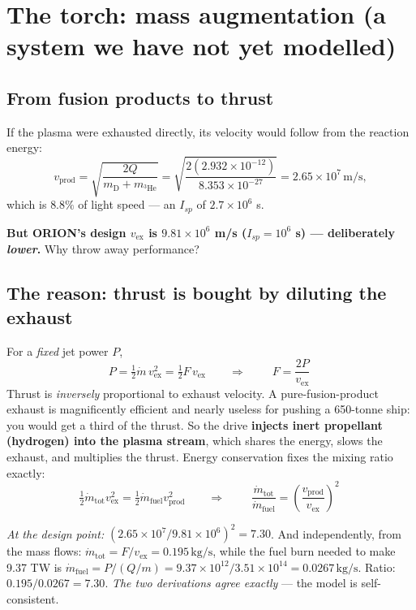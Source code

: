 \documentclass[11pt]{article}
\newcommand{\ve}{v_{\text{ex}}}
\newcommand{\he}{\ensuremath{{}^3\mathrm{He}}}
\newcommand{\unit}[1]{\,\mathrm{#1}}
\begin{document}
\section{The torch: mass augmentation (a system we have not yet modelled)}

\subsection{From fusion products to thrust}
If the plasma were exhausted directly, its velocity would follow from the reaction energy:
\begin{equation}
v_{\text{prod}}=\sqrt{\frac{2Q}{m_{\mathrm{D}}+m_{\he}}}
=\sqrt{\frac{2(2.932\times10^{-12})}{8.353\times10^{-27}}}
=2.65\times10^{7}\unit{m/s},
\end{equation}
which is $8.8\%$ of light speed --- an $I_{sp}$ of $2.7\times10^{6}$ s.

\textbf{But ORION's design $\ve$ is $9.81\times10^{6}$ m/s ($I_{sp}=10^{6}$ s) --- deliberately \emph{lower}.} Why throw away performance?

\subsection{The reason: thrust is bought by diluting the exhaust}
For a \emph{fixed} jet power $P$,
\begin{equation}
P=\tfrac12\dot m\,\ve^{2}=\tfrac12 F\,\ve
\qquad\Longrightarrow\qquad
\boxed{\;F=\frac{2P}{\ve}\;}
\end{equation}
Thrust is \emph{inversely} proportional to exhaust velocity. A pure-fusion-product exhaust is magnificently efficient and nearly useless for pushing a 650-tonne ship: you would get a third of the thrust. So the drive \textbf{injects inert propellant (hydrogen) into the plasma stream}, which shares the energy, slows the exhaust, and multiplies the thrust. Energy conservation fixes the mixing ratio exactly:
\begin{equation}
\tfrac12\dot m_{\text{tot}}\ve^{2}=\tfrac12\dot m_{\text{fuel}}v_{\text{prod}}^{2}
\qquad\Longrightarrow\qquad
\boxed{\;\frac{\dot m_{\text{tot}}}{\dot m_{\text{fuel}}}=\left(\frac{v_{\text{prod}}}{\ve}\right)^{2}\;}
\end{equation}

\textit{At the design point:} $(2.65\times10^{7}/9.81\times10^{6})^{2}=\mathbf{7.30}$. And independently, from the mass flows: $\dot m_{\text{tot}}=F/\ve=0.195\unit{kg/s}$, while the fuel burn needed to make 9.37 TW is $\dot m_{\text{fuel}}=P/(Q/m)=9.37\times10^{12}/3.51\times10^{14}=0.0267\unit{kg/s}$. Ratio: $0.195/0.0267=\mathbf{7.30}$. \emph{The two derivations agree exactly} --- the model is self-consistent.
\end{document}
